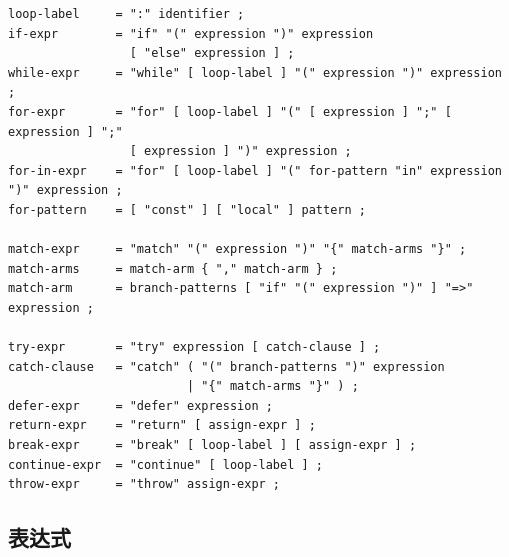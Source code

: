 \documentclass[UTF8,12pt]{ctexart}
\begin{document}
\begin{lstlisting}
loop-label     = ":" identifier ;
if-expr        = "if" "(" expression ")" expression
                 [ "else" expression ] ;
while-expr     = "while" [ loop-label ] "(" expression ")" expression ;
for-expr       = "for" [ loop-label ] "(" [ expression ] ";" [ expression ] ";"
                 [ expression ] ")" expression ;
for-in-expr    = "for" [ loop-label ] "(" for-pattern "in" expression ")" expression ;
for-pattern    = [ "const" ] [ "local" ] pattern ;

match-expr     = "match" "(" expression ")" "{" match-arms "}" ;
match-arms     = match-arm { "," match-arm } ;
match-arm      = branch-patterns [ "if" "(" expression ")" ] "=>" expression ;

try-expr       = "try" expression [ catch-clause ] ;
catch-clause   = "catch" ( "(" branch-patterns ")" expression
                         | "{" match-arms "}" ) ;
defer-expr     = "defer" expression ;
return-expr    = "return" [ assign-expr ] ;
break-expr     = "break" [ loop-label ] [ assign-expr ] ;
continue-expr  = "continue" [ loop-label ] ;
throw-expr     = "throw" assign-expr ;
\end{lstlisting}

\subsection{表达式}
\end{document}
